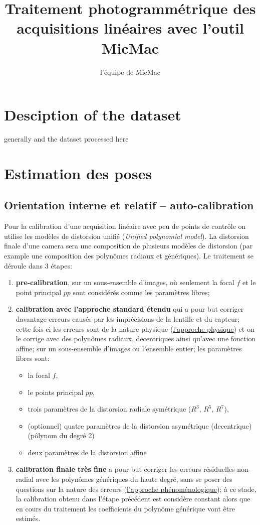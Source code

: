 \documentclass[11pt,a4paper,oneside]{book}
\author{l'équipe de MicMac}
\title{Traitement photogrammétrique des acquisitions linéaires avec l'outil MicMac}
\begin{document}
\maketitle
\tableofcontents
\chapter{Desciption of the dataset}
generally and the dataset processed here

\chapter{Estimation des poses}

\section{Orientation interne et relatif -- auto-calibration}
Pour la calibration d'une acquisition linéaire avec peu de points de contrôle on utilise les modèles de distorsion unifié (\textit{Unified polynomial model}). 
La distorsion finale d'une camera sera une composition de plusieurs modèles de distorsion (par example une composition des polynômes radiaux et génériques). Le traitement se déroule dans 3 étapes:
%
\begin{enumerate}
\item \textbf{pre-calibration}, sur un sous-ensemble d'images, où seulement la focal $f$ et le point principal $pp$ sont considérés comme les paramètres libres;
\item \textbf{calibration avec l'approche standard étendu} qui a pour but corriger davantage erreurs causés par les imprécisions de la lentille et du capteur; cette fois-ci les erreurs sont {de la nature physique} (\underline{l’approche physique}) et on le corrige avec des polynômes radiaux, decentriques ainsi qu'avec une fonction affine; sur un sous-ensemble d'images ou l'ensemble entier; les paramètres libres sont:
	\begin{itemize}
	\item la focal $f$,
	\item le points principal $pp$,
	\item trois paramètres de la distorsion radiale symétrique ($R^3$, $R^5$, $R^7$),
	\item (optionnel) quatre paramètres de la distorsion asymétrique (decentrique) (pôlynom du degré 2)
	\item deux paramètres de la distorsion affine 
	\end{itemize}
\item \textbf{calibration finale très fine} a pour but corriger les erreurs résiduelles non-radial avec les polynômes génériques du haute degré, sans se poser des questions sur la nature des erreurs (\underline{l’approche phénoménologique}); à ce stade, la calibration obtenu dans l'étape précédent est considère constant alors que en cours du traitement les coefficients du polynôme générique vont être estimés.
\end{enumerate}
\end{document}
